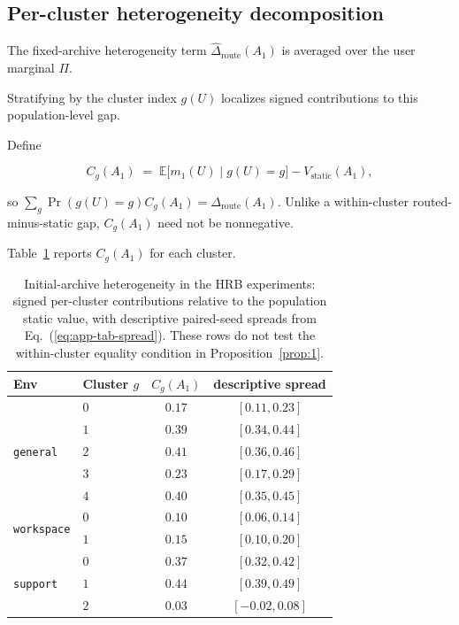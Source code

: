 \documentclass{article} %
\renewcommand{\eqref}[1]{\textup{(\ref{#1})}}
\begin{document}
\subsection{Per-cluster heterogeneity decomposition}

\label{app:tab-cluster}

The fixed-archive heterogeneity term $\widehat\Delta_{\mathrm{route}}(A_1)$ is averaged over the user marginal $\Pi$.

Stratifying by the cluster index \(g(U)\) localizes signed contributions to
this population-level gap.

Define

\begin{equation}
\label{eq:app-tab-clustergap}
C_g(A_1)
\;=\;
\mathbb{E}\big[m_1(U)\mid g(U)=g\big]
- V_{\mathrm{static}}(A_1),
\end{equation}

so \(\sum_g\Pr(g(U)=g)C_g(A_1)=\Delta_{\mathrm{route}}(A_1)\).
Unlike a within-cluster routed-minus-static gap, \(C_g(A_1)\) need not be
nonnegative.

Table~\ref{tab:app-cluster} reports \(C_g(A_1)\) for each cluster.

\begin{table}[h]
\centering
\small
\caption{Initial-archive heterogeneity in the HRB experiments: signed
per-cluster contributions relative to the population static value, with descriptive paired-seed spreads from
Eq.~\eqref{eq:app-tab-spread}.
These rows do not test the within-cluster equality condition in
Proposition~\ref{prop:1}.}
\label{tab:app-cluster}
\begin{tabular}{llcc}
\toprule
Env & Cluster $g$ & $C_g(A_1)$ & descriptive spread \\
\midrule
\multirow{5}{*}{\texttt{general}}
 & $0$ & $0.17$ & $[0.11, 0.23]$ \\
 & $1$ & $0.39$ & $[0.34, 0.44]$ \\
 & $2$ & $0.41$ & $[0.36, 0.46]$ \\
 & $3$ & $0.23$ & $[0.17, 0.29]$ \\
 & $4$ & $0.40$ & $[0.35, 0.45]$ \\
\midrule
\multirow{2}{*}{\texttt{workspace}}
 & $0$ & $0.10$ & $[0.06, 0.14]$ \\
 & $1$ & $0.15$ & $[0.10, 0.20]$ \\
\midrule
\multirow{3}{*}{\texttt{support}}
 & $0$ & $0.37$ & $[0.32, 0.42]$ \\
 & $1$ & $0.44$ & $[0.39, 0.49]$ \\
 & $2$ & $0.03$ & $[-0.02, 0.08]$ \\
\bottomrule
\end{tabular}

\end{table}
\end{document}
